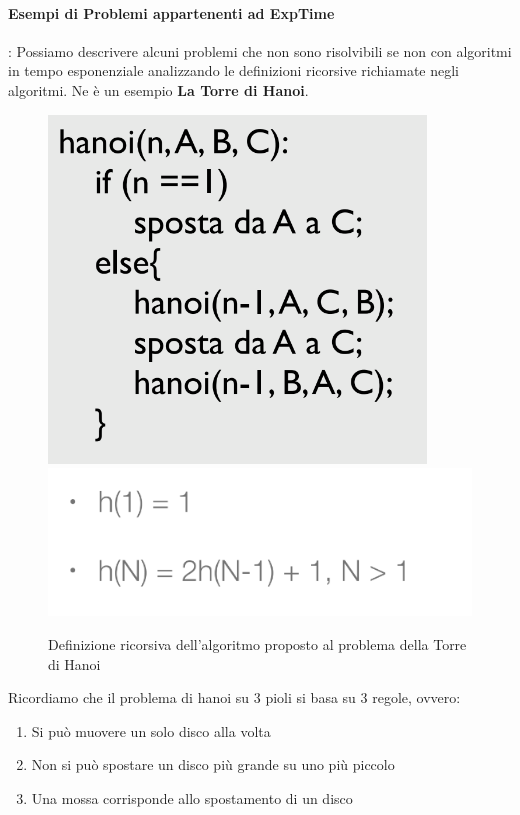 \documentclass{article}
\begin{document}
\paragraph{Esempi di Problemi appartenenti ad ExpTime}: Possiamo descrivere alcuni problemi che non sono risolvibili se non con algoritmi in tempo esponenziale analizzando le definizioni ricorsive richiamate negli algoritmi. Ne è un esempio \textbf{La Torre di Hanoi}.

\begin{figure}[htbp]
    \center
    \includegraphics[scale=0.45]{img/torreHanoi1.png}
    \includegraphics[scale=0.45]{img/torreHanoi.png}
    \caption{Definizione ricorsiva dell'algoritmo proposto al problema della Torre di Hanoi}
\end{figure}

Ricordiamo che il problema di hanoi su 3 pioli si basa su 3 regole, ovvero:
\begin{enumerate}
    \item Si può muovere un solo disco alla volta
    \item Non si può spostare un disco più grande su uno più piccolo
    \item Una mossa corrisponde allo spostamento di un disco
\end{enumerate}
\end{document}
